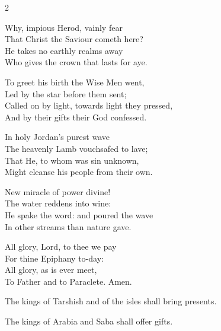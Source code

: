 \documentclass[12pt]{book}
\begin{document}
\begin{multicols}{2}
\begin{enpars}
\raggedcolumns
Why, impious Herod, vainly fear\\
That Christ the Saviour cometh here?\\
He takes no earthly realms away\\
Who gives the crown that lasts for aye.

To greet his birth the Wise Men went,\\
Led by the star before them sent;\\
Called on by light, towards light they pressed,\\
And by their gifts their God confessed.

In holy Jordan's purest wave\\
The heavenly Lamb vouchsafed to lave;\\
That He, to whom was sin unknown,\\
Might cleanse his people from their own.

New miracle of power divine!\\
The water reddens into wine:\\
He spake the word: and poured the wave\\
In other streams than nature gave.

All glory, Lord, to thee we pay\\
For thine Epiphany to-day:\\
All glory, as is ever meet,\\
To Father and to Paraclete. Amen.

\end{enpars}
\end{multicols}


\label{versiculus_vesperis_epiphianiae_domini}
   
   \begin{enpars} \noindent \vv The kings of Tarshish and of the isles shall bring presents.

\noindent \rr  The kings of Arabia and Saba shall offer gifts.\end{enpars}

\newpage


\end{document}

